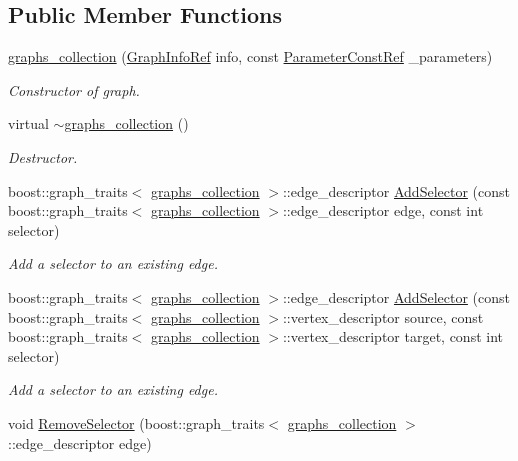 \subsection*{Public Member Functions}
\begin{DoxyCompactItemize}
\item 
\hyperlink{structgraphs__collection_a7fe206e9809e6e2abc61574f41886a75}{graphs\+\_\+collection} (\hyperlink{graph__info_8hpp_a4a5c364c379e5139b7dc97e7e69c7da3}{Graph\+Info\+Ref} info, const \hyperlink{Parameter_8hpp_a37841774a6fcb479b597fdf8955eb4ea}{Parameter\+Const\+Ref} \+\_\+parameters)
\begin{DoxyCompactList}\small\item\em Constructor of graph. \end{DoxyCompactList}\item 
virtual \hyperlink{structgraphs__collection_ae317ca538bc5904eded24c0e6b6d2587}{$\sim$graphs\+\_\+collection} ()
\begin{DoxyCompactList}\small\item\em Destructor. \end{DoxyCompactList}\item 
boost\+::graph\+\_\+traits$<$ \hyperlink{structgraphs__collection}{graphs\+\_\+collection} $>$\+::edge\+\_\+descriptor \hyperlink{structgraphs__collection_adcd8cfbff5b78d0b5efa7c50e0226bb4}{Add\+Selector} (const boost\+::graph\+\_\+traits$<$ \hyperlink{structgraphs__collection}{graphs\+\_\+collection} $>$\+::edge\+\_\+descriptor edge, const int selector)
\begin{DoxyCompactList}\small\item\em Add a selector to an existing edge. \end{DoxyCompactList}\item 
boost\+::graph\+\_\+traits$<$ \hyperlink{structgraphs__collection}{graphs\+\_\+collection} $>$\+::edge\+\_\+descriptor \hyperlink{structgraphs__collection_aad4e620510dc2da5a835d49149701fe4}{Add\+Selector} (const boost\+::graph\+\_\+traits$<$ \hyperlink{structgraphs__collection}{graphs\+\_\+collection} $>$\+::vertex\+\_\+descriptor source, const boost\+::graph\+\_\+traits$<$ \hyperlink{structgraphs__collection}{graphs\+\_\+collection} $>$\+::vertex\+\_\+descriptor target, const int selector)
\begin{DoxyCompactList}\small\item\em Add a selector to an existing edge. \end{DoxyCompactList}\item 
void \hyperlink{structgraphs__collection_ad08e6a01c10e908cdc2b177000460c4a}{Remove\+Selector} (boost\+::graph\+\_\+traits$<$ \hyperlink{structgraphs__collection}{graphs\+\_\+collection} $>$\+::edge\+\_\+descriptor edge)

\end{DoxyCompactItemize}
